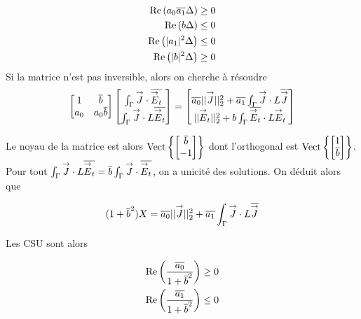 \begin{align}
\Re\left(a_0\conj{a_1}\Delta\right) &\ge 0\\
\Re\left(b\Delta\right) &\le 0\\
\Re\left(|a_1|^2\Delta\right) &\le 0\\
\Re\left(|b|^2\Delta\right) &\ge 0
\end{align}
Si la matrice n'est pas inversible, alors on cherche à résoudre
\[
\begin{bmatrix}
1 & \conj{b} \\
a_0 & a_0\conj{b}
\end{bmatrix}
\begin{bmatrix}
\int_\Gamma \vJ \cdot \conj{\vE_t} \\
\int_\Gamma \vJ \cdot L\conj{\vE_t}
\end{bmatrix}
=
\begin{bmatrix}
\conj{a_0}||\vJ||_2^2 + \conj{a_1}\int_\Gamma \vJ \cdot L\conj{\vJ} \\
||\vE_t||_2^2 + b\int_\Gamma \conj{\vE_t} \cdot L\vE_t
\end{bmatrix}
\]

Le noyau de la matrice est alors $\Vect{\begin{bmatrix}\conj{b}\\-1\end{bmatrix}}$ dont l'orthogonal est  $\Vect{\begin{bmatrix}1\\\conj{b}\end{bmatrix}}$.
Pour tout $\int_\Gamma \vJ\cdot L\conj{\vE_t} = \conj{b} \int_\Gamma \vJ \cdot \conj{\vE_t} $, on a unicité des solutions. On déduit alors que

\[
(1 + \conj{b}^2) X = \conj{a_0} ||\vJ||_2^2 + \conj{a_1}\int_\Gamma \vJ \cdot L\conj{\vJ}
\]

Les CSU sont alors

\begin{align}
\Re\left(\frac{\conj{a_0}}{1 + \conj{b}^2}\right) &\ge 0 \\
\Re\left(\frac{\conj{a_1}}{1 + \conj{b}^2}\right) &\le 0
\end{align}



